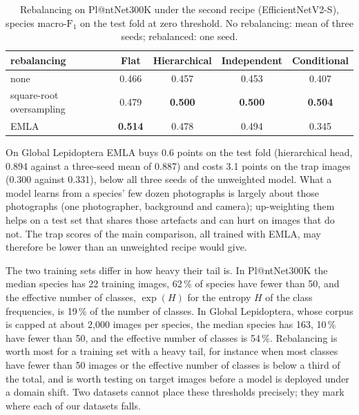 \begin{table}[htb]
    \centering
    \caption{Rebalancing on Pl@ntNet300K under the second recipe (EfficientNetV2-S), species macro-$\text{F}_1$ on the test fold at zero threshold. No rebalancing: mean of three seeds; rebalanced: one seed.}
    \label{tab:longtail}
    \begin{tabular}{lcccc}
        \toprule
        rebalancing & Flat & Hierarchical & Independent & Conditional \\
        \midrule
        none & 0.466 & 0.457 & 0.453 & 0.407 \\
        square-root oversampling & 0.479 & \textbf{0.500} & \textbf{0.500} & \textbf{0.504} \\
        EMLA & \textbf{0.514} & 0.478 & 0.494 & 0.345 \\
        \bottomrule
    \end{tabular}
\end{table}

On Global Lepidoptera EMLA buys 0.6 points on the test fold (hierarchical head, 0.894 against a three-seed mean of 0.887) and costs 3.1 points on the trap images (0.300 against 0.331), below all three seeds of the unweighted model.
What a model learns from a species' few dozen photographs is largely about those photographs (one photographer, background and camera); up-weighting them helps on a test set that shares those artefacts and can hurt on images that do not.
The trap scores of the main comparison, all trained with EMLA, may therefore be lower than an unweighted recipe would give.

The two training sets differ in how heavy their tail is.
In Pl@ntNet300K the median species has 22 training images, 62\,\% of species have fewer than 50, and the effective number of classes, $\exp(H)$ for the entropy $H$ of the class frequencies, is 19\,\% of the number of classes.
In Global Lepidoptera, whose corpus is capped at about 2,000 images per species, the median species has 163, 10\,\% have fewer than 50, and the effective number of classes is 54\,\%.
Rebalancing is worth most for a training set with a heavy tail, for instance when most classes have fewer than 50 images or the effective number of classes is below a third of the total, and is worth testing on target images before a model is deployed under a domain shift.
Two datasets cannot place these thresholds precisely; they mark where each of our datasets falls.
